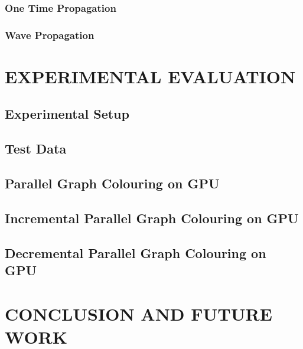 \documentclass[MTech]{iitmdiss}
\begin{document}
\subsection{One Time Propagation}
\subsection{Wave Propagation}
\chapter{EXPERIMENTAL EVALUATION}
\section{Experimental Setup}
\section{Test Data}
\section{Parallel Graph Colouring on GPU}
\section{Incremental Parallel Graph Colouring on GPU}
\section{Decremental Parallel Graph Colouring on GPU}
\chapter{CONCLUSION AND FUTURE WORK}

%
%

\pagebreak
\begin{singlespace}
  \begin{small}
	
  \end{small}
\end{singlespace}



%
\end{document}
